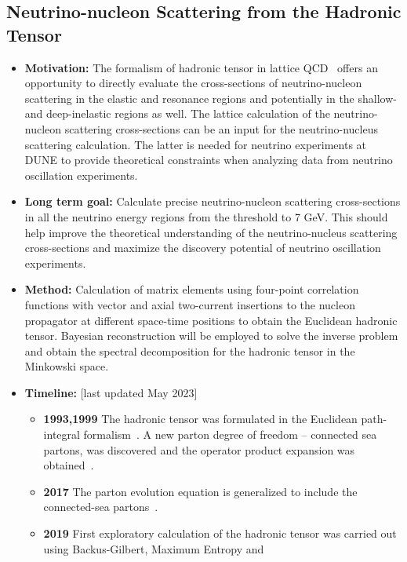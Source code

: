 \documentclass[12pt,hyperpdf]{article}
\begin{document}
\subsection{Neutrino-nucleon Scattering from the Hadronic Tensor}
\begin{itemize}
    \item{\bf Motivation:} The formalism of hadronic tensor in lattice
      QCD~\cite{Liu:1993cv,Liu:1999ak} offers an opportunity to
      directly evaluate the cross-sections of neutrino-nucleon
      scattering in the elastic and resonance regions and potentially
      in the shallow- and deep-inelastic regions as well. The lattice
      calculation of the neutrino-nucleon scattering cross-sections
      can be an input for the neutrino-nucleus scattering
      calculation. The latter is needed for neutrino experiments at
      DUNE to provide theoretical constraints when analyzing data from
      neutrino oscillation experiments. 
    \item{\bf Long term goal:} Calculate precise neutrino-nucleon
      scattering cross-sections in all the neutrino energy regions
      from the threshold to 7 GeV. This should help improve the
      theoretical understanding of the neutrino-nucleus scattering
      cross-sections and maximize the discovery potential of neutrino
      oscillation experiments. 
    \item{\bf Method:}  Calculation of matrix elements using four-point
      correlation functions with vector and axial two-current
      insertions to the nucleon propagator at different space-time
      positions to obtain the Euclidean hadronic tensor. Bayesian
      reconstruction will be employed to solve the inverse problem and
      obtain the spectral decomposition for the hadronic tensor in the
      Minkowski space. 
\item{\bf Timeline:} \hfill [last updated May 2023]
    \begin{itemize}
    \item{\bf 1993,1999} The hadronic tensor was formulated in the
      Euclidean path-integral formalism~\cite{Liu:1993cv}. A new
      parton degree of freedom -- connected sea partons, was
      discovered and the operator product expansion was
      obtained~\cite{Liu:1999ak}. 
  \item{\bf 2017} The parton evolution equation is generalized to include
    the connected-sea partons~\cite{Liu:2017lpe}. 
    \item{\bf 2019} First exploratory calculation of the hadronic tensor
      was carried out using Backus-Gilbert, Maximum Entropy and

\end{itemize}
\end{itemize}
\end{document}
